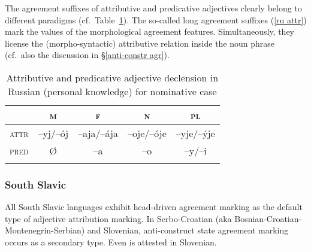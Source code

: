 The agreement suffixes of attributive and predicative adjectives clearly belong to different paradigms (cf.~Table~\ref{Russian adj agr paradigm}). The so-called long agreement suffixes (\ref{ru attr}) mark the values of the morphological agreement features. Simultaneously, they license the (morpho-syntactic) attributive relation inside the noun phrase (cf.~also the discussion in \S\ref{anti-constr agr}). 
\begin{table}[h]
\begin{tabular}{l c c c c}
\lsptoprule			
			&\textsc{m}	&\textsc{f}		&\textsc{n}	&\textsc{pl}\\
\midrule
\textsc{attr}	&–yj/–ój		&–aja/–ája	&–oje/–óje	&–yje/–\'yje\\
\textsc{pred}	&{Ø}		&–a			&–o			&–y/–i\\
\lspbottomrule
\end{tabular}
\caption[Adjective paradigm for Russian]{Attributive and predicative adjective declension in Russian (personal knowledge) for nominative case}
\label{Russian adj agr paradigm}
\end{table}

\subsubsection{South Slavic}
\label{s-slavic synchr}
All South Slavic languages exhibit head\hyp{}driven agreement marking as the default type of adjective attribution marking. In Serbo-Croatian (aka Bosnian-Croatian-Montenegrin-Serbian) and Slovenian, anti\hyp{}construct state agreement marking occurs as a secondary type. Even  is attested in Slovenian.

